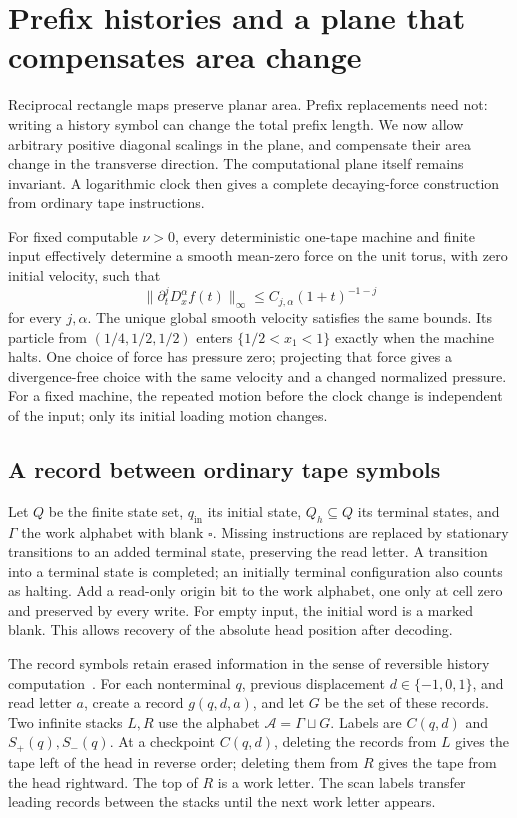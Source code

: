 \section{Prefix histories and a plane that compensates area change}\label{bcs:prefix-section}
Reciprocal rectangle maps preserve planar area. Prefix replacements need not: writing a history symbol can change the total prefix length. We now allow arbitrary positive diagonal scalings in the plane, and compensate their area change in the transverse direction. The computational plane itself remains invariant. A logarithmic clock then gives a complete decaying-force construction from ordinary tape instructions.

\begin{theorem}\label{bcs:prefix-theorem}
For fixed computable $\nu>0$, every deterministic one-tape machine and finite input effectively determine a smooth mean-zero force on the unit torus, with zero initial velocity, such that
\[
 \|\partial_t^jD_x^\alpha f(t)\|_\infty\le C_{j,\alpha}(1+t)^{-1-j}
\]
for every $j,\alpha$. The unique global smooth velocity satisfies the same bounds. Its particle from $(1/4,1/2,1/2)$ enters $\{1/2<x_1<1\}$ exactly when the machine halts. One choice of force has pressure zero; projecting that force gives a divergence-free choice with the same velocity and a changed normalized pressure. For a fixed machine, the repeated motion before the clock change is independent of the input; only its initial loading motion changes.
\end{theorem}

\subsection{A record between ordinary tape symbols}
Let $Q$ be the finite state set, $q_{\mathrm{in}}$ its initial state, $Q_h\subseteq Q$ its terminal states, and $\Gamma$ the work alphabet with blank $\square$. Missing instructions are replaced by stationary transitions to an added terminal state, preserving the read letter. A transition into a terminal state is completed; an initially terminal configuration also counts as halting. Add a read-only origin bit to the work alphabet, one only at cell zero and preserved by every write. For empty input, the initial word is a marked blank. This allows recovery of the absolute head position after decoding.

The record symbols retain erased information in the sense of reversible history computation~\cite{Bennett1973}. For each nonterminal $q$, previous displacement $d\in\{-1,0,1\}$, and read letter $a$, create a record $g(q,d,a)$, and let $G$ be the set of these records. Two infinite stacks $L,R$ use the alphabet $\mathcal A=\Gamma\sqcup G$. Labels are $C(q,d)$ and $S_+(q),S_-(q)$. At a checkpoint $C(q,d)$, deleting the records from $L$ gives the tape left of the head in reverse order; deleting them from $R$ gives the tape from the head rightward. The top of $R$ is a work letter. The scan labels transfer leading records between the stacks until the next work letter appears.

